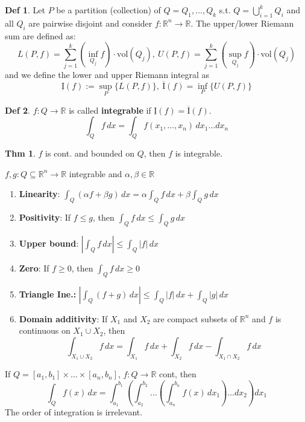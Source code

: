 \documentclass[a4paper, 10pt]{article}
\theoremstyle{definition}
\newtheorem*{theorem}{Thm}
\newtheorem*{definition}{Def}
\newcommand{\R}{\mathbb{R}}
\begin{document}
\begin{definition}
    Let \(P\) be a partition (collection) of \(Q = Q_1, \ldots, Q_k\) s.t. \(Q = \bigcup_{i=1}^k Q_i\) and all \(Q_i\) are pairwise disjoint and consider \(f: \R^n \to \R\).
    The upper/lower Riemann sum are defined as:
    \[L(P, f) = \sum_{j = 1}^k (\inf_{Q_j} f) \cdot \text{vol}(Q_j), \ U(P, f) = \sum_{j = 1}^k (\sup_{Q_j} f) \cdot \text{vol}(Q_j)\]
    and we define the lower and upper Riemann integral as
    \[\underline{\text{I}}(f) := \sup_P \{L(P, f)\}, \ \overline{\text{I}}(f) = \inf_P \{U(P, f)\}\]
\end{definition}

\begin{definition}
    \(f: Q \to \R\) is called \textbf{integrable} if \(\underline{\text{I}}(f) = \overline{\text{I}}(f)\).
    \[\int_Q f \,dx = \int_Q f(x_1, \ldots, x_n) \, dx_1 \ldots dx_n\]
\end{definition}

\begin{theorem}
    \(f\) is cont. and bounded on \(Q\), then \(f\) is integrable.
\end{theorem}

\begin{ntheorem*}[Properties] \(f,g : Q \subseteq \R^n \to \R\) integrable and \(\alpha, \beta \in \R\)
    \begin{enumerate}[leftmargin=15pt]
        \item \textbf{Linearity}: \(\int_Q(\alpha f + \beta g) \, dx = \alpha \int_Q f \, dx + \beta \int_Q g \,dx\)
        \item \textbf{Positivity}: If \(f \leq g\), then \(\int_Q f \, dx \leq \int_Q g \, dx\)
        \item \textbf{Upper bound}: \(| \int_Q f \, dx | \leq \int_Q |f| \, dx\)
        \item \textbf{Zero}: If \(f \geq 0\), then \(\int_Q f \, dx \geq 0\)
        \item \textbf{Triangle Ine.:} \(| \int_Q (f + g) \, dx | \leq \int_Q |f| \, dx + \int_Q |g| \, dx\)
        \item \textbf{Domain additivity}: If \(X_1\) and \(X_2\) are compact subsets of \(\R^n\) and \(f\) is continuous on \(X_1 \cup X_2\), then
        \[\int_{X_1 \cup X_2} f \, dx = \int_{X_1} f \, dx + \int_{X_2} f \, dx - \int_{X_1 \cap X_2} f \, dx\]
    \end{enumerate}
\end{ntheorem*}

\begin{ntheorem*}
    If \(Q = [a_1, b_1] \times \ldots \times [a_n, b_n]\), \(f: Q \to \R\) cont, then
    \[\int_Q f(x) \, dx = \int_{a_1}^{b_1} \left(\int_{a_2}^{b_2} \ldots \left( \int_{a_n}^{b_n} f(x) \, dx_1 \right) \ldots dx_2\right) dx_1\]
    The order of integration is irrelevant.
\end{ntheorem*}
\end{document}
